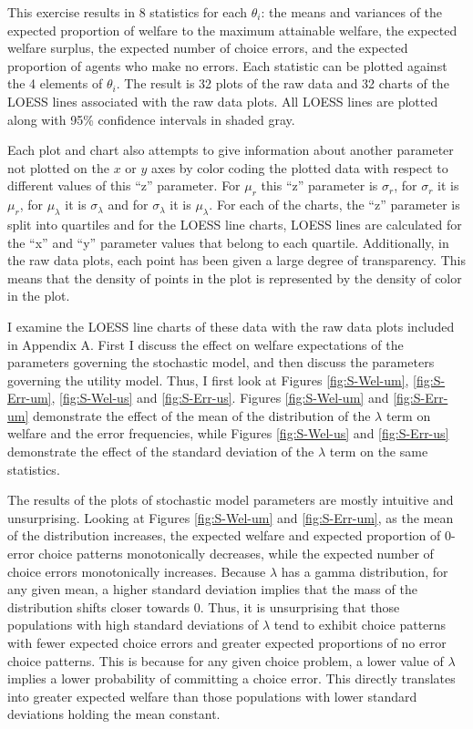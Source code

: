 \documentclass[../main.tex]{subfiles}
\begin{document}
This exercise results in 8 statistics for each $\theta_i$: the means and variances of the expected proportion of welfare to the maximum attainable welfare, the expected welfare surplus, the expected number of choice errors, and the expected proportion of agents who make no errors.
Each statistic can be plotted against the 4 elements of $\theta_i$.
The result is 32 plots of the raw data and 32 charts of the LOESS lines associated with the raw data plots.
All LOESS lines are plotted along with 95\% confidence intervals in shaded gray.

Each plot and chart also attempts to give information about another parameter not plotted on the $x$ or $y$ axes by color coding the plotted data with respect to different values of this \enquote{z} parameter.
For $\mu_r$ this \enquote{z} parameter is $\sigma_r$, for $\sigma_r$ it is $\mu_r$, for $\mu_\lambda$ it is $\sigma_\lambda$ and for $\sigma_\lambda$ it is $\mu_\lambda$.
For each of the charts, the \enquote{z} parameter is split into quartiles and for the LOESS line charts, LOESS lines are calculated for the \enquote{x} and \enquote{y} parameter values that belong to each quartile.
Additionally, in the raw data plots, each point has been given a large degree of transparency.
This means that the density of points in the plot is represented by the density of color in the plot.

I examine the LOESS line charts of these data with the raw data plots included in Appendix A.
First I discuss the effect on welfare expectations of the parameters governing the stochastic model, and then discuss the parameters governing the utility model.
Thus, I first look at Figures \ref{fig:S-Wel-um}, \ref{fig:S-Err-um}, \ref{fig:S-Wel-us} and \ref{fig:S-Err-us}.
Figures \ref{fig:S-Wel-um} and \ref{fig:S-Err-um} demonstrate the effect of the mean of the distribution of the $\lambda$ term on welfare and the error frequencies, while Figures \ref{fig:S-Wel-us} and \ref{fig:S-Err-us} demonstrate the effect of the standard deviation of the $\lambda$ term on the same statistics.

The results of the plots of stochastic model parameters are mostly intuitive and unsurprising.
Looking at Figures \ref{fig:S-Wel-um} and \ref{fig:S-Err-um}, as the mean of the distribution increases, the expected welfare and expected proportion of 0-error choice patterns monotonically decreases, while the expected number of choice errors monotonically increases.
Because $\lambda$ has a gamma distribution, for any given mean, a higher standard deviation implies that the mass of the distribution shifts closer towards $0$.
Thus, it is unsurprising that those populations with high standard deviations of $\lambda$ tend to exhibit choice patterns with fewer expected choice errors and greater expected proportions of no error choice patterns.
This is because for any given choice problem, a lower value of $\lambda$ implies a lower probability of committing a choice error.{\footnotemark}
This directly translates into greater expected welfare than those populations with lower standard deviations holding the mean constant.
\end{document}
